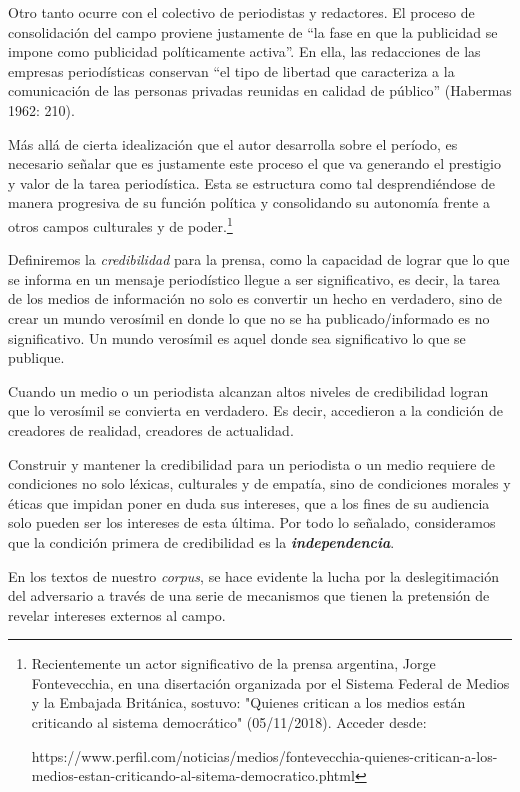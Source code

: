 Otro tanto ocurre con el colectivo de periodistas y redactores. El proceso de consolidación del campo proviene justamente de ``la fase en que la publicidad se impone como publicidad políticamente activa''. En ella, las redacciones de las empresas periodísticas conservan ``el tipo de libertad que caracteriza a la comunicación de las personas privadas reunidas en calidad de público'' (Habermas 1962: 210).

Más allá de cierta idealización que el autor desarrolla sobre el período, es necesario señalar que es justamente este proceso el que va generando el prestigio y valor de la tarea periodística. Esta se estructura como tal desprendiéndose de manera progresiva de su función política y consolidando su autonomía frente a otros campos culturales y de poder.\footnote{Recientemente un actor significativo de la prensa argentina, Jorge Fontevecchia, en una disertación organizada por el Sistema Federal de Medios y la Embajada Británica, sostuvo: "Quienes critican a los medios están criticando al sistema democrático" (05/11/2018). Acceder desde:

  https://www.perfil.com/noticias/medios/fontevecchia-quienes-critican-a-los-medios-estan-criticando-al-sitema-democratico.phtml}

Definiremos la \emph{credibilidad} para la prensa, como la capacidad de lograr que lo que se informa en un mensaje periodístico llegue a ser significativo, es decir, la tarea de los medios de información no solo es convertir un hecho en verdadero, sino de crear un mundo verosímil en donde lo que no se ha publicado/informado es no significativo. Un mundo verosímil es aquel donde sea significativo lo que se publique.

Cuando un medio o un periodista alcanzan altos niveles de credibilidad logran que lo verosímil se convierta en verdadero. Es decir, accedieron a la condición de creadores de realidad, creadores de actualidad.

Construir y mantener la credibilidad para un periodista o un medio requiere de condiciones no solo léxicas, culturales y de empatía, sino de condiciones morales y éticas que impidan poner en duda sus intereses, que a los fines de su audiencia solo pueden ser los intereses de esta última. Por todo lo señalado, consideramos que la condición primera de credibilidad es la \emph{\textbf{independencia}}.

En los textos de nuestro \emph{corpus}, se hace evidente la lucha por la deslegitimación del adversario a través de una serie de mecanismos que tienen la pretensión de revelar intereses externos al campo.

